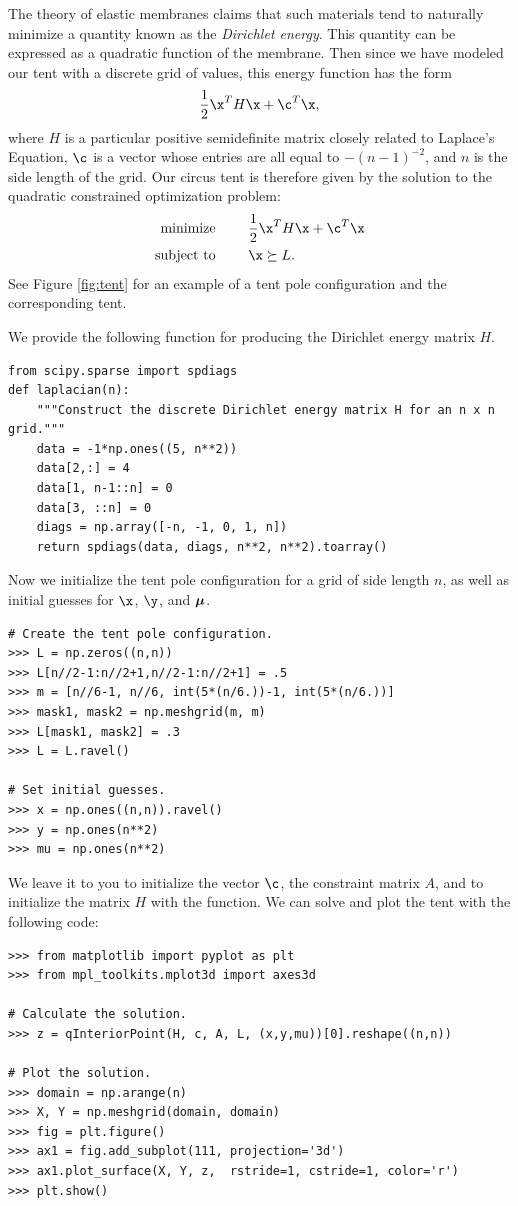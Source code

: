 The theory of elastic membranes claims that such materials tend to naturally minimize a quantity known as the \emph{Dirichlet energy}.
This quantity can be expressed as a quadratic function of the membrane.
Then since we have modeled our tent with a discrete grid of values, this energy function has the form \[\frac{1}{2}\x^T H \x + \c^T \x,\] where $H$ is a particular positive semidefinite matrix closely related to Laplace's Equation, $\c$ is a vector whose entries are all equal to $-(n-1)^{-2}$, and $n$ is the side length of the grid.
Our circus tent is therefore given by the solution to the quadratic constrained optimization problem:
\begin{align*}
\text{minimize }\qquad &\frac{1}{2}\x^T H \x + \c^T \x\\
\text{subject to }\qquad &\x \succeq L.\\
\end{align*}
See Figure \ref{fig:tent} for an example of a tent pole configuration and the corresponding tent.

We provide the following function for producing the Dirichlet energy matrix $H$.
\begin{lstlisting}
from scipy.sparse import spdiags
def laplacian(n):
    """Construct the discrete Dirichlet energy matrix H for an n x n grid."""
    data = -1*np.ones((5, n**2))
    data[2,:] = 4
    data[1, n-1::n] = 0
    data[3, ::n] = 0
    diags = np.array([-n, -1, 0, 1, n])
    return spdiags(data, diags, n**2, n**2).toarray()
\end{lstlisting}
Now we initialize the tent pole configuration for a grid of side length $n$, as well as initial guesses for $\x$, $\y$, and $\boldsymbol{\mu}$.
\begin{lstlisting}
# Create the tent pole configuration.
>>> L = np.zeros((n,n))
>>> L[n//2-1:n//2+1,n//2-1:n//2+1] = .5
>>> m = [n//6-1, n//6, int(5*(n/6.))-1, int(5*(n/6.))]
>>> mask1, mask2 = np.meshgrid(m, m)
>>> L[mask1, mask2] = .3
>>> L = L.ravel()

# Set initial guesses.
>>> x = np.ones((n,n)).ravel()
>>> y = np.ones(n**2)
>>> mu = np.ones(n**2)
\end{lstlisting}
We leave it to you to initialize the vector $\c$, the constraint matrix $A$,
and to initialize the matrix $H$ with the  function.
We can solve and plot the tent with the following code:
\begin{lstlisting}
>>> from matplotlib import pyplot as plt
>>> from mpl_toolkits.mplot3d import axes3d

# Calculate the solution.
>>> z = qInteriorPoint(H, c, A, L, (x,y,mu))[0].reshape((n,n))

# Plot the solution.
>>> domain = np.arange(n)
>>> X, Y = np.meshgrid(domain, domain)
>>> fig = plt.figure()
>>> ax1 = fig.add_subplot(111, projection='3d')
>>> ax1.plot_surface(X, Y, z,  rstride=1, cstride=1, color='r')
>>> plt.show()
\end{lstlisting}

